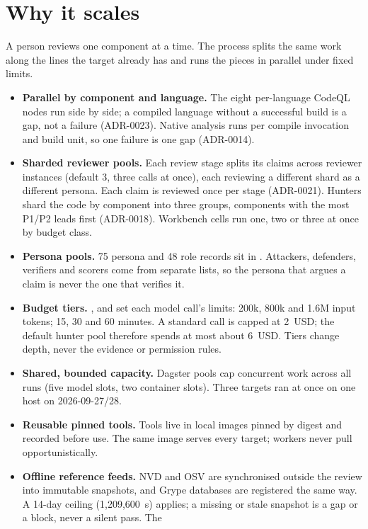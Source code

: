 \documentclass[10pt,a4paper]{article}
\begin{document}
\section{Why it scales}
A person reviews one component at a time. The process splits the same work along the lines the
target already has and runs the pieces in parallel under fixed limits.
\begin{itemize}
\item \textbf{Parallel by component and language.} The eight per-language CodeQL nodes run side by
side; a compiled language without a successful build is a gap, not a failure (ADR-0023). Native
analysis runs per compile invocation and build unit, so one failure is one gap (ADR-0014).
\item \textbf{Sharded reviewer pools.} Each review stage splits its claims across reviewer instances
(default 3, three calls at once), each reviewing a different shard as a different persona. Each
claim is reviewed once per stage (ADR-0021). Hunters shard the code by component into three groups,
components with the most P1/P2 leads first (ADR-0018). Workbench cells run one, two or three at once
by budget class.
\item \textbf{Persona pools.} 75 persona and 48 role records sit in
. Attackers, defenders, verifiers and scorers come from
separate lists, so the persona that argues a claim is never the one that verifies it.
\item \textbf{Budget tiers.} ,  and  set each model call's
limits: 200k, 800k and 1.6M input tokens; 15, 30 and 60 minutes. A standard call is capped at
2~USD; the default hunter pool therefore spends at most about 6~USD. Tiers change depth, never the
evidence or permission rules.
\item \textbf{Shared, bounded capacity.} Dagster pools cap concurrent work across all runs (five
model slots, two container slots). Three targets ran at once on one host on 2026-09-27/28.
\item \textbf{Reusable pinned tools.} Tools live in local images pinned by digest and recorded
before use. The same image serves every target; workers never pull opportunistically.
\item \textbf{Offline reference feeds.} NVD and OSV are synchronised outside the review into
immutable snapshots, and Grype databases are registered the same way. A 14-day ceiling
(1,209,600~s) applies; a missing or stale snapshot is a gap or a block, never a silent pass. The

\end{itemize}
\end{document}

